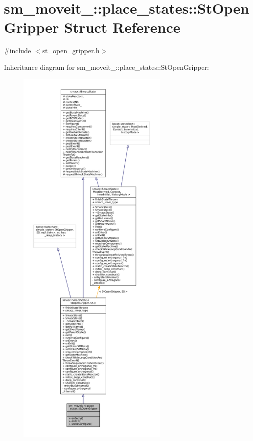 \hypertarget{structsm__moveit__4_1_1place__states_1_1StOpenGripper}{}\section{sm\+\_\+moveit\+\_\+:\+:place\+\_\+states\+:\+:St\+Open\+Gripper Struct Reference}
\label{structsm__moveit__4_1_1place__states_1_1StOpenGripper}


{\ttfamily \#include $<$st\+\_\+open\+\_\+gripper.\+h$>$}



Inheritance diagram for sm\+\_\+moveit\+\_\+:\+:place\+\_\+states\+:\+:St\+Open\+Gripper\+:
\nopagebreak
\begin{figure}[H]
\begin{center}
\leavevmode
\includegraphics[height=550pt]{structsm__moveit__4_1_1place__states_1_1StOpenGripper__inherit__graph}
\end{center}
\end{figure}


